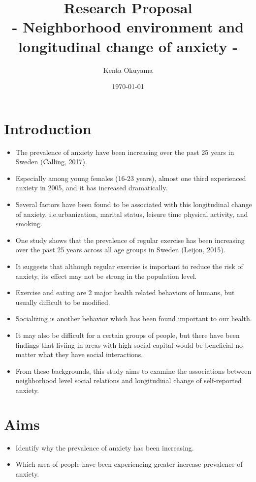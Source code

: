 \documentclass{article}
\title{
	Research Proposal \\
 - Neighborhood environment and longitudinal change of anxiety -  }
\date{\today}
\author{Kenta Okuyama}
\begin{document}
\maketitle

\section{Introduction} 
\begin{itemize}
	\item The prevalence of anxiety have been increasing over the past 25 years in Sweden (Calling, 2017).
	\item Especially among young females (16-23 years), almost one third experienced anxiety in 2005, and it has increased dramatically. 
	\item Several factors have been found to be associated with this longitudinal change of anxiety, i.e.urbanization, marital status, leisure time physical activity, and smoking.
	\item One study shows that the prevalence of regular exercise has been increasing over the past 25 years across all age groups in Sweden (Leijon, 2015).
	\item It suggests that although regular exercise is important to reduce the risk of anxiety, its effect may not be strong in the population level.
	\item Exercise and eating are 2 major health related behaviors of humans, but usually difficult to be modified.
	\item Socializing is another behavior which has been found important to our health.
	\item It may also be difficult for a certain groups of people, but there have been findings that liviing in areas with high social capital would be beneficial no matter what they have social interactions.
	\item From these backgrounds, this study aims to examine the associations between neighborhood level social relations and longitudinal change of self-reported anxiety.
\end{itemize}

\section{Aims}
\begin{itemize}
	\item Identify why the prevalence of anxiety has been increasing.
	\item Which area of people have been experiencing greater increase prevalence of anxiety.
\end{itemize}
\end{document}
